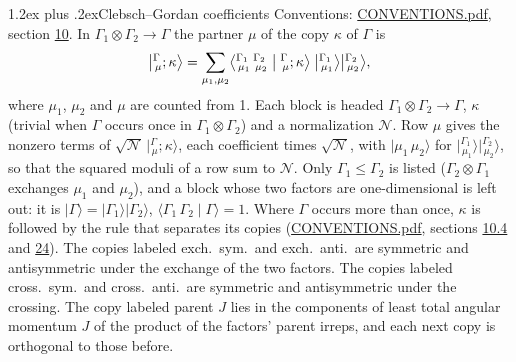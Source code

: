 \documentclass[10pt,a4paper]{article}
\makeatletter
\renewcommand\section{\@startsection{section}{1}{\z@}{-3ex plus -1ex minus -.2ex}%
  {1.2ex plus .2ex}{\normalfont\large\sffamily\bfseries\color{parttitle}}}
\numberwithin{equation}{section}
\newcommand{\irrprod}{\otimes}
\newcommand{\mult}{\kappa}
\newcommand{\intx}{\mu}
\newcommand{\cgnorm}{\mathcal{N}}
\newcommand{\cgket}[3]{\bigl\lvert{}^{#1}_{\,#2};#3\bigr\rangle}
\newcommand{\irket}[2]{\bigl\lvert{}^{#1}_{\,#2}\bigr\rangle}
\newcommand{\prodket}[2]{\lvert {#1}\,{#2}\rangle}
\newcommand{\ket}[1]{\lvert #1\rangle}
\newcommand{\cgck}[7]{\bigl\langle{}^{#1}_{\,#2}\,{}^{#3}_{\,#4}\bigm\vert{}^{#5}_{\,#6};#7\bigr\rangle}
\newcommand{\cgcone}[3]{\langle #1\,#2\mid #3\rangle}
\makeatother
\begin{document}
\section{Clebsch--Gordan coefficients}\label{s:clebsch_gordan}
Conventions: \href{../../CONVENTIONS.pdf}{CONVENTIONS.pdf}, section \href{../../../rotation/CONVENTIONS.pdf\#conv.10}{10}.
\leavevmode\label{n:index.copy}\label{n:index.cg}\label{n:vector.ket.coupled}\label{n:function.cg.copy}In $\Gamma_1\irrprod\Gamma_2\to\Gamma$ the partner $\intx$ of the copy $\mult$ of $\Gamma$ is
\begin{equation}\label{e:cg}\cgket{\Gamma}{\intx}{\mult} = \sum_{\intx_1,\intx_2}\cgck{\Gamma_1}{\intx_1}{\Gamma_2}{\intx_2}{\Gamma}{\intx}{\mult}\;\irket{\Gamma_1}{\intx_1}\irket{\Gamma_2}{\intx_2},\end{equation}
where $\intx_1$, $\intx_2$ and $\intx$ are counted from 1. \label{n:index.normalisation}Each block is headed $\Gamma_1\irrprod\Gamma_2\to\Gamma$, $\mult$ (trivial when $\Gamma$ occurs once in $\Gamma_1\irrprod\Gamma_2$) and a normalization $\cgnorm$. \label{n:vector.ket.product}Row $\intx$ gives the nonzero terms of $\sqrt{\cgnorm}\,\cgket{\Gamma}{\intx}{\mult}$, each coefficient times $\sqrt{\cgnorm}$, with $\prodket{\intx_1}{\intx_2}$ for $\irket{\Gamma_1}{\intx_1}\irket{\Gamma_2}{\intx_2}$, so that the squared moduli of a row sum to $\cgnorm$. \label{n:vector.ket.one}\label{n:function.cg.one}Only $\Gamma_1 \le \Gamma_2$ is listed ($\Gamma_2\irrprod\Gamma_1$ exchanges $\intx_1$ and $\intx_2$), and a block whose two factors are one-dimensional is left out: it is $\ket{\Gamma} = \ket{\Gamma_1}\ket{\Gamma_2}$, $\cgcone{\Gamma_1}{\Gamma_2}{\Gamma} = 1$.
Where $\Gamma$ occurs more than once, $\mult$ is followed by the rule that separates its copies (\href{../../CONVENTIONS.pdf}{CONVENTIONS.pdf}, sections \href{../../../rotation/CONVENTIONS.pdf\#conv.10.4}{10.4} and \href{../../CONVENTIONS.pdf\#conv.24}{24}). \label{n:abbreviation.exchange}The copies labeled exch.\ sym.\ and exch.\ anti.\ are symmetric and antisymmetric under the exchange of the two factors. \label{n:abbreviation.crossing}The copies labeled cross.\ sym.\ and cross.\ anti.\ are symmetric and antisymmetric under the crossing. \label{n:abbreviation.parent.su2}The copy labeled parent $J$ lies in the components of least total angular momentum $J$ of the product of the factors' parent irreps, and each next copy is orthogonal to those before.
\end{document}
